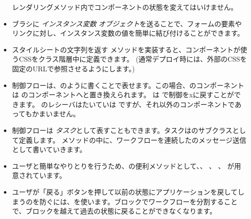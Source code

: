 \documentclass[a4paper,10pt,twoside]{book}
\begin{document}
\begin{itemize}
レンダリングメソッド内でコンポーネントの状態を変えてはいけません。
  \item ブラシに \emph{インスタンス変数}  \emph{オブジェクト}を送ることで、フォームの要素やリンクに対し、インスタンス変数の値を簡単に結び付けることができます。
  \item スタイルシートの文字列を返す メソッドを実装すると、コンポーネントが使うCSSをクラス階層中に定義できます。
    (通常デプロイ時には、外部のCSSを固定のURLで参照させるようにします。)
  \item 制御フローは、のように書くことで表せます。この場合、のコンポーネントは のコンポーネントへと置き換えられます。  は  で制御をxに戻すことができます。
    のレシーバはたいていは ですが、それ以外のコンポーネントであってもかまいません。
  \item 制御フローは \emph{タスク}として表すこともできます。タスクはのサブクラスとして定義します。 メソッドの中に、ワークフローを連続したのメッセージ送信として書いていきます。
  \item ユーザと簡単なやりとりを行うため、の便利メソッドとして、、 、 、 が用意されています。
  \item ユーザが「戻る」ボタンを押して以前の状態にアプリケーションを戻してしまうのを防ぐには、を使います。ブロックでワークフローを分割することで、ブロックを越えて過去の状態に戻ることができなくなります。
\end{itemize}

\ifx\wholebook\relax\else 
   
   
\end{document}
